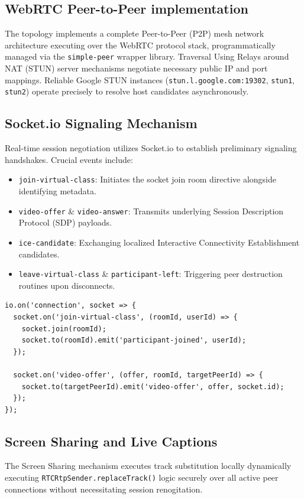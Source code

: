 \documentclass[12pt, journal, onecolumn]{IEEEtran}
\begin{document}
\subsection{WebRTC Peer-to-Peer implementation}
The topology implements a complete Peer-to-Peer (P2P) mesh network architecture executing over the WebRTC protocol stack, programmatically managed via the \texttt{simple-peer} wrapper library. Traversal Using Relays around NAT (STUN) server mechanisms negotiate necessary public IP and port mappings. Reliable Google STUN instances (\texttt{stun.l.google.com:19302}, \texttt{stun1}, \texttt{stun2}) operate precisely to resolve host candidates asynchronously.

\subsection{Socket.io Signaling Mechanism}
Real-time session negotiation utilizes Socket.io to establish preliminary signaling handshakes. Crucial events include:
\begin{itemize}
    \item \texttt{join-virtual-class}: Initiates the socket join room directive alongside identifying metadata.
    \item \texttt{video-offer} \& \texttt{video-answer}: Transmits underlying Session Description Protocol (SDP) payloads.
    \item \texttt{ice-candidate}: Exchanging localized Interactive Connectivity Establishment candidates.
    \item \texttt{leave-virtual-class} \& \texttt{participant-left}: Triggering peer destruction routines upon disconnects.
\end{itemize}

\begin{lstlisting}[caption=Socket.io WebRTC Signaling Event Handler]
io.on('connection', socket => {
  socket.on('join-virtual-class', (roomId, userId) => {
    socket.join(roomId);
    socket.to(roomId).emit('participant-joined', userId);
  });
  
  socket.on('video-offer', (offer, roomId, targetPeerId) => {
    socket.to(targetPeerId).emit('video-offer', offer, socket.id);
  });
});
\end{lstlisting}

\subsection{Screen Sharing and Live Captions}
The Screen Sharing mechanism executes track substitution locally dynamically executing \texttt{RTCRtpSender.replaceTrack()} logic securely over all active peer connections without necessitating session renogitation.
\end{document}
